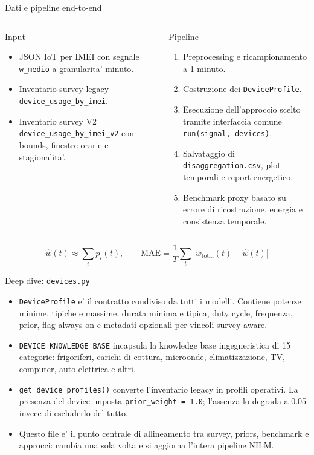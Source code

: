 \documentclass[aspectratio=169]{beamer}
\newcommand{\code}[1]{\texttt{#1}}
\begin{document}
\begin{frame}{Dati e pipeline end-to-end}
\small
\begin{columns}[T]
\begin{block}{Input}
\begin{itemize}
  \item JSON IoT per IMEI con segnale \code{w\_medio} a granularita' minuto.
  \item Inventario survey legacy \code{device\_usage\_by\_imei}.
  \item Inventario survey V2 \code{device\_usage\_by\_imei\_v2} con bounds, finestre orarie e stagionalita'.
\end{itemize}
\end{block}

\begin{block}{Pipeline}
\begin{enumerate}
  \item Preprocessing e ricampionamento a 1 minuto.
  \item Costruzione dei \code{DeviceProfile}.
  \item Esecuzione dell'approccio scelto tramite interfaccia comune \code{run(signal, devices)}.
  \item Salvataggio di \code{disaggregation.csv}, plot temporali e report energetico.
  \item Benchmark proxy basato su errore di ricostruzione, energia e consistenza temporale.
\end{enumerate}
\end{block}
\end{columns}

\vspace{0.3em}
\[
\widehat{w}(t) \approx \sum_i p_i(t), \qquad
\mathrm{MAE} = \frac{1}{T}\sum_t |w_{\mathrm{total}}(t) - \widehat{w}(t)|
\]
\end{frame}

\begin{frame}{Deep dive: \code{devices.py}}
\small
\begin{itemize}
  \item \code{DeviceProfile} e' il contratto condiviso da tutti i modelli. Contiene potenze minime, tipiche e massime, durata minima e tipica, duty cycle, frequenza, prior, flag always-on e metadati opzionali per vincoli survey-aware.
  \item \code{DEVICE\_KNOWLEDGE\_BASE} incapsula la knowledge base ingegneristica di 15 categorie: frigoriferi, carichi di cottura, microonde, climatizzazione, TV, computer, auto elettrica e altri.
  \item \code{get\_device\_profiles()} converte l'inventario legacy in profili operativi. La presenza del device imposta \code{prior\_weight = 1.0}; l'assenza lo degrada a 0.05 invece di escluderlo del tutto.
  \item Questo file e' il punto centrale di allineamento tra survey, priors, benchmark e approcci: cambia una sola volta e si aggiorna l'intera pipeline NILM.
\end{itemize}
\end{frame}
\end{document}
